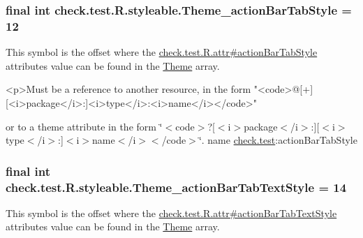 \subsubsection[{Theme\+\_\+action\+Bar\+Tab\+Style}]{\setlength{\rightskip}{0pt plus 5cm}final int check.\+test.\+R.\+styleable.\+Theme\+\_\+action\+Bar\+Tab\+Style = 12\hspace{0.3cm}{\ttfamily [static]}}\label{classcheck_1_1test_1_1_r_1_1styleable_ac7c5d9db6774de90f8feae957a5c9525}
This symbol is the offset where the \hyperlink{classcheck_1_1test_1_1_r_1_1attr_af4b84f04cbf930199baf459bd577b438}{check.\+test.\+R.\+attr\#action\+Bar\+Tab\+Style} attribute\textquotesingle{}s value can be found in the \hyperlink{classcheck_1_1test_1_1_r_1_1styleable_acca726d02016a0cf607782ec3a436a81}{Theme} array.

\begin{DoxyVerb}      <p>Must be a reference to another resource, in the form "<code>@[+][<i>package</i>:]<i>type</i>:<i>name</i></code>"
\end{DoxyVerb}
 or to a theme attribute in the form \char`\"{}$<$code$>$?\mbox{[}$<$i$>$package$<$/i$>$\+:\mbox{]}\mbox{[}$<$i$>$type$<$/i$>$\+:\mbox{]}$<$i$>$name$<$/i$>$$<$/code$>$\char`\"{}.  name \hyperlink{namespacecheck_1_1test}{check.\+test}\+:action\+Bar\+Tab\+Style \hypertarget{classcheck_1_1test_1_1_r_1_1styleable_a1733f98ca23b42c6fdd6a6e560392fc2}{}
\subsubsection[{Theme\+\_\+action\+Bar\+Tab\+Text\+Style}]{\setlength{\rightskip}{0pt plus 5cm}final int check.\+test.\+R.\+styleable.\+Theme\+\_\+action\+Bar\+Tab\+Text\+Style = 14\hspace{0.3cm}{\ttfamily [static]}}\label{classcheck_1_1test_1_1_r_1_1styleable_a1733f98ca23b42c6fdd6a6e560392fc2}
This symbol is the offset where the \hyperlink{classcheck_1_1test_1_1_r_1_1attr_aff28ad7140f8babb08a120b09cb32cc9}{check.\+test.\+R.\+attr\#action\+Bar\+Tab\+Text\+Style} attribute\textquotesingle{}s value can be found in the \hyperlink{classcheck_1_1test_1_1_r_1_1styleable_acca726d02016a0cf607782ec3a436a81}{Theme} array.

